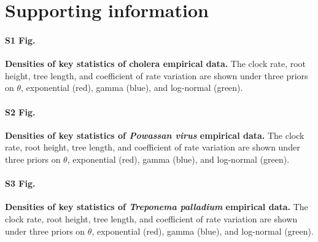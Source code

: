 \documentclass[10pt,letterpaper]{article}
\begin{document}
\nolinenumbers


%
%
% 



\section*{Supporting information}

\paragraph*{S1 Fig.}
\label{S1_Fig}
	\textbf{Densities of key statistics of cholera empirical data.} The clock rate, root height, tree length, and coefficient of rate variation are shown under three priors on $\theta$, exponential (red), gamma (blue), and log-normal (green).

\paragraph*{S2 Fig.}
\label{S2_Fig}
	\textbf{Densities of key statistics of \textit{Powassan virus} empirical data.} The clock rate, root height, tree length, and coefficient of rate variation are shown under three priors on $\theta$, exponential (red), gamma (blue), and log-normal (green).

\paragraph*{S3 Fig.}
\label{S3_Fig}
	\textbf{Densities of key statistics of \textit{Treponema palladium} empirical data.} The clock rate, root height, tree length, and coefficient of rate variation are shown under three priors on $\theta$, exponential (red), gamma (blue), and log-normal (green).
\end{document}
